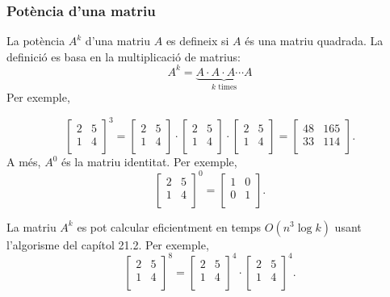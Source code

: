 \subsubsection{Potència d'una matriu}


La potència $A^k$ d'una matriu $A$ es defineix si $A$ és una matriu
quadrada. La definició es basa en la multiplicació de matrius:
\[ A^k = \underbrace{A \cdot A \cdot A \cdots A}_{\textrm{$k$ times}} \]
Per exemple,


\[
 \begin{bmatrix}
  2 & 5 \\
  1 & 4 \\
 \end{bmatrix}^3 =
 \begin{bmatrix}
  2 & 5 \\
  1 & 4 \\
 \end{bmatrix} \cdot
 \begin{bmatrix}
  2 & 5 \\
  1 & 4 \\
 \end{bmatrix} \cdot
 \begin{bmatrix}
  2 & 5 \\
  1 & 4 \\
 \end{bmatrix} =
 \begin{bmatrix}
  48 & 165 \\
  33 & 114 \\
 \end{bmatrix}.
\]
A més, $A^0$ és la matriu identitat. Per exemple,
\[
 \begin{bmatrix}
  2 & 5 \\
  1 & 4 \\
 \end{bmatrix}^0 =
 \begin{bmatrix}
  1 & 0 \\
  0 & 1 \\
 \end{bmatrix}.
\]


La matriu $A^k$ es pot calcular eficientment en temps $O(n^3 \log k)$
usant l'algorisme del capítol 21.2. Per exemple,
\[
 \begin{bmatrix}
  2 & 5 \\
  1 & 4 \\
 \end{bmatrix}^8 =
 \begin{bmatrix}
  2 & 5 \\
  1 & 4 \\
 \end{bmatrix}^4 \cdot
 \begin{bmatrix}
  2 & 5 \\
  1 & 4 \\
 \end{bmatrix}^4.
\]


